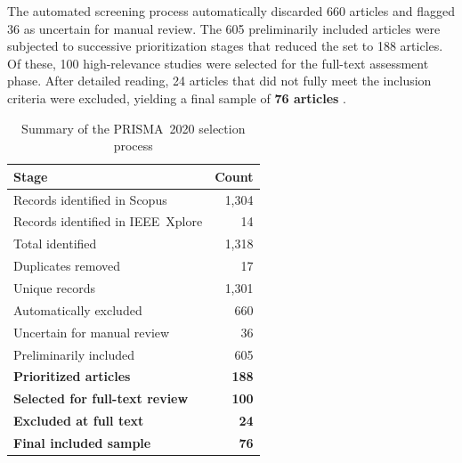 \documentclass[conference]{IEEEtran}
\begin{document}
The automated screening process automatically discarded 660
articles and flagged 36 as uncertain for manual review. The
605 preliminarily included articles were subjected to
successive prioritization stages that reduced the set to 188
articles. Of these, 100 high-relevance studies were selected
for the full-text assessment phase. After detailed reading,
24 articles that did not fully meet the inclusion criteria
were excluded, yielding a final sample of
\textbf{76 articles}
\cite{FloresSacoto2025, Miranda2024, DeLima2025, Souza2023,
Konczycki2025, Silva2024, Tavares2024, Lalangui2024,
deLima2024, Matos2025, Silva2025, Santos2024,
AlmeidadeSouza2024, BirchenallJimenez2024, Perotto2025,
DaudtLemos2025, Paz2023, Gomes2023, dosSantos2024,
Saavedra2025, Lopes2025, Pungartnik2025, deFreitas2024,
MedeirosSilva2025, Gomes2023b, CharlesLeija2024, Veloso2025,
Bermudi2025, Freitas2024, DeLima2025, Damasceno2025,
deMelo2024, daSilva2024, Biazussi2025, Silveira2024,
Rocha2025, VieiraDuarte2024, Leandro2024, deSousa2024,
Alves2021, Guo2020, Alves2022, DzulManzanilla2021,
Silva2023, Berra2020, Siqueira2021, doCarmo2020,
daSilva2022, Wangdi2022, Adegboye2021, Pereira2021,
Pereira2021b, SoaresSantana2021,
doSocorroCarvalhoMiranda2022, GaytcanCamarillo2021,
daSilva2023, Schultes2021, Miranda2021, FcalixRocha2023,
Nina2023, Costa2021, DeOliveira2021, Huang2021,
Skalinski2022, Braga2021, Braz2021, Coutinho2022,
daSilvaSoeiro2022, Medeiros2023, Echenique2021,
Leandro2022, CortesEscamilla2022, deMelo2023, Ueno2021,
Castro2021, Queiroz2021}.

\begin{table}[t]
\centering
\caption{Summary of the PRISMA~2020 selection process}
\label{tab:cribado}
\begin{tabular}{lr}
\toprule
Stage & Count \\
\midrule
Records identified in Scopus           & 1,304 \\
Records identified in IEEE~Xplore      & 14    \\
Total identified                        & 1,318 \\
Duplicates removed                      & 17    \\
Unique records                          & 1,301 \\
Automatically excluded                  & 660   \\
Uncertain for manual review             & 36    \\
Preliminarily included                  & 605   \\
\midrule
\textbf{Prioritized articles}           & \textbf{188} \\
\textbf{Selected for full-text review}  & \textbf{100} \\
\textbf{Excluded at full text}          & \textbf{24}  \\
\textbf{Final included sample}          & \textbf{76}  \\
\bottomrule
\end{tabular}
\end{table}
\end{document}
